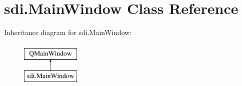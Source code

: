 \hypertarget{classsdi_1_1MainWindow}{}\section{sdi.\+Main\+Window Class Reference}
\label{classsdi_1_1MainWindow}
Inheritance diagram for sdi.\+Main\+Window\+:\begin{figure}[H]
\begin{center}
\leavevmode
\includegraphics[height=2.000000cm]{classsdi_1_1MainWindow}
\end{center}
\end{figure}
